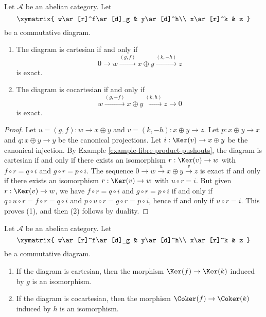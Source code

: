\begin{lemma}
\label{lemma-characterize-cartesian}
Let $\mathcal{A}$ be an abelian category. Let
$$
\xymatrix{
w\ar[r]^f\ar[d]_g
& y\ar[d]^h\\
x\ar[r]^k
& z
}
$$
be a commutative diagram. 
\begin{enumerate}
\item The diagram is cartesian if and only if 
$$
0 \to w \xrightarrow{(g, f)} x \oplus y \xrightarrow{(k, -h)} z
$$
is exact.
\item The diagram is cocartesian if and only if 
$$
w \xrightarrow{(g, -f)} x \oplus y \xrightarrow{(k, h)} z \to 0
$$
is exact.
\end{enumerate}
\end{lemma}

\begin{proof}
Let $u = (g, f) : w \to x \oplus y$ and $v = (k, -h) : x \oplus y \to z$. 
Let $p : x \oplus y \to x$ and $q : x \oplus y \to y$ be the canonical 
projections. Let $i : \Ker(v) \to x \oplus y$ be the canonical 
injection. By Example \ref{example-fibre-product-pushouts}, the diagram is 
cartesian if and only if there exists an isomorphism 
$r : \Ker(v) \to w$ with $f \circ r = q \circ i$ and 
$g \circ r = p \circ i$. The sequence 
$0 \to w \overset{u} \to x \oplus y \overset{v} \to z$ is exact if and 
only if there exists an isomorphism $r : \Ker(v) \to w$ with 
$u \circ r = i$. But given $r : \Ker(v) \to w$, we have 
$f \circ r = q \circ i$ and $g \circ r = p \circ i$ if and 
only if $q \circ u \circ r= f \circ r = q \circ i$ and 
$p \circ u \circ r = g \circ r = p \circ i$, hence if and only if
$u \circ r = i$. This proves (1), and then (2) follows by duality. 
\end{proof}

\begin{lemma}
\label{lemma-cartesian-kernel}
Let $\mathcal{A}$ be an abelian category. Let
$$
\xymatrix{
w\ar[r]^f\ar[d]_g
& y\ar[d]^h\\
x\ar[r]^k
& z
}
$$
be a commutative diagram.
\begin{enumerate}
\item If the diagram is cartesian, then the morphism 
$\Ker(f)\to\Ker(k)$ induced by $g$ is an isomorphism.
\item If the diagram is cocartesian, then the morphism 
$\Coker(f)\to\Coker(k)$ induced by $h$ is an isomorphism.
\end{enumerate}
\end{lemma}

